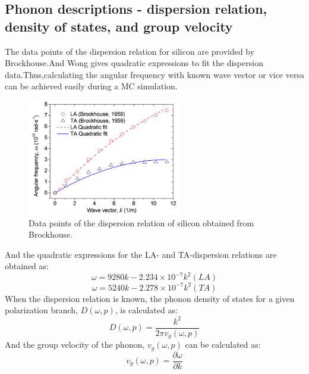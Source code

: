 \subsection*{Phonon descriptions - dispersion relation, density of states, and group velocity}
The data points of the dispersion relation for silicon are provided
by Brockhouse\cite{brockhouse}.And Wong gives quadratic expressions to fit the dispersion data.Thus,calculating
the angular frequency with known wave vector or vice versa can
be achieved easily during a MC simulation. 
\begin{figure}[htbp!] 
\centering    
\includegraphics[width=0.6\textwidth]{dispersion}
\caption[Phonon Dispersion of Silicon]{Data points of the dispersion relation of silicon obtained from Brockhouse\cite{brockhouse}.}
\label{fig:dispersion}
\end{figure}
\indent And the quadratic expressions
for the LA- and TA-dispersion relations are obtained as:
\begin{equation}
\omega=9280k - 2.234 \times 10^{-7} k^2 (LA) \label{con:1}
\end{equation}
\begin{equation}
\omega= 5240k - 2.278 \times  10^{-7} k^2 (TA) \label{con:2}
\end{equation}
When the dispersion relation is known, the phonon density of states for a given polarization branch, $D(\omega,p)$, is calculated as:
\begin{equation}
D(\omega ,p)=\frac{k^2}{2 \pi v_g(\omega,p)}
\end{equation}
And the group velocity of the phonon, $v_g(\omega,p)$ can be calculated as:
\begin{equation}
v_g(\omega,p)=\frac{\partial \omega}{\partial k}   \label{con:4}
\end{equation}
